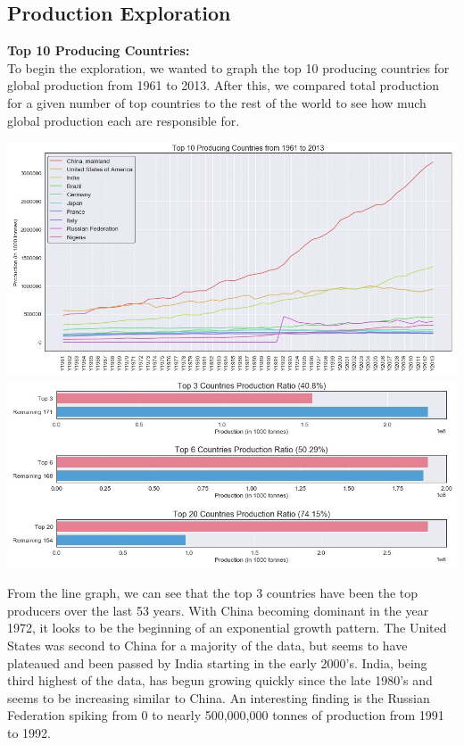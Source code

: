 \documentclass[12pt, a4paper]{article}
\begin{document}
\begin{spacing}{1.1}
	\subsection{Production Exploration}
	\textbf{Top 10 Producing Countries:}\\
	To begin the exploration, we wanted to graph the top 10 producing countries for global production from 1961 to 2013. After this, we compared total production for a given number of top countries to the rest of the world to see how much global production each are responsible for.
	\begin{center}
	\includegraphics[scale=.58]{top_20_c_yearly} \vspace*{2mm}\\
	\includegraphics[scale=.58]{top_20_c_total}
	\end{center}
	From the line graph, we can see that the top 3 countries have been the top producers over the last 53 years. With China becoming dominant in the year 1972, it looks to be the beginning of an exponential growth pattern. The United States was second to China for a majority of the data, but seems to have plateaued and been passed by India starting in the early 2000's. India, being third highest of the data, has begun growing quickly since the late 1980's and seems to be increasing similar to China. An interesting finding is the Russian Federation spiking from 0 to nearly 500,000,000 tonnes of production from 1991 to 1992. \newpage


\end{spacing}
\end{document}
